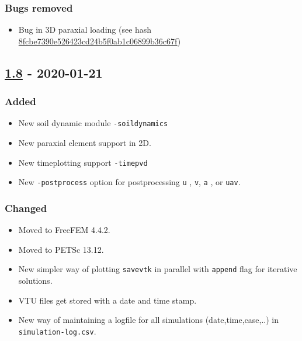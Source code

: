 \subsubsection{Bugs removed}

\begin{itemize}
\tightlist
\item
  Bug in 3D paraxial loading (see hash
  \href{https://codev-tuleap.intra.cea.fr/plugins/git/hpcseism/freefem?a=blobdiff\&h=f23846d41b3eee27b9f2c3b852b9c5e2f90080c5\&hp=0af4cfcc1355b98cc09a94e42c8ec521c6c0bb00\&hb=8fcbe7390e526423cd24b5f0ab1c06899b36c67f\&f=src\%2Fpsd-preprocessor\%2FMacros.hpp}{8fcbe7390e526423cd24b5f0ab1c06899b36c67f})
\end{itemize}

\subsection{\texorpdfstring{\href{https://gitlab.com/PsdSolver/psd_sources/-/tree/v1.8}{1.8}
- 2020-01-21}{1.8 - 2020-01-21}}

\subsubsection{Added}

\begin{itemize}
\tightlist
\item
  New soil dynamic module \lstinline!-soildynamics!
\item
  New paraxial element support in 2D.
\item
  New timeplotting support \lstinline!-timepvd!
\item
  New \lstinline!-postprocess! option for postprocessing \lstinline!u! ,
  \lstinline!v!, \lstinline!a! , or \lstinline!uav!.
\end{itemize}

\subsubsection{Changed}

\begin{itemize}
\tightlist
\item
  Moved to FreeFEM 4.4.2.
\item
  Moved to PETSc 13.12.
\item
  New simpler way of plotting \lstinline!savevtk! in parallel with
  \lstinline!append! flag for iterative solutions.
\item
  VTU files get stored with a date and time stamp.
\item
  New way of maintaining a logfile for all simulations
  (date,time,case,..) in \lstinline!simulation-log.csv!.
\end{itemize}


